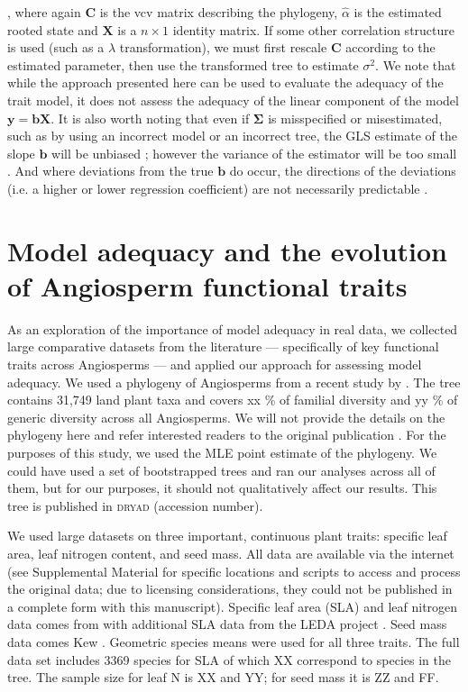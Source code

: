 \documentclass[a4paper,12pt]{article}
\begin{document}
\citep{GarlandIves2000, Freckleton2002}, where again $\mathbf{C}$ is the vcv matrix describing the phylogeny, $\hat{\alpha}$ is the estimated rooted state and $\mathbf{X}$ is a $n \times 1$ identity matrix. If some other correlation structure is used (such as a $\lambda$ transformation), we must first rescale $\mathbf{C}$ according to the estimated parameter, then use the transformed tree to estimate $\sigma^2$. We note that while the approach presented here can be used to evaluate the adequacy of the trait model, it does not assess the adequacy of the linear component of the model $\mathbf{y} = \mathbf{b}\mathbf{X}$. It is also worth noting that even if $\mathbf{\Sigma}$ is misspecified or misestimated, such as by using an incorrect model or an incorrect tree, the GLS estimate of the slope $\mathbf{b}$ will be unbiased \citep{Rao1999}; however the variance of the estimator will be too small \citep{Rohlf2006}. And where deviations from the true $\mathbf{b}$ do occur, the directions of the deviations (i.e. a higher or lower regression coefficient) are not necessarily predictable \citep{Rohlf2006}.

\section*{Model adequacy and the evolution of Angiosperm functional traits}
As an exploration of the importance of model adequacy in real data, we collected large comparative datasets from the literature --- specifically of key functional traits across Angiosperms --- and applied our approach for assessing model adequacy. We used a phylogeny of Angiosperms from a recent study by \citet{Zanne2013}. The tree contains 31,749 land plant taxa and covers xx \% of familial diversity and yy \% of generic diversity across all Angiosperms. We will not provide the details on the phylogeny here and refer interested readers to the original publication \citep{Zanne2013}. For the purposes of this study, we used the MLE point estimate of the phylogeny. We could have used a set of bootstrapped trees and ran our analyses across all of them, but for our purposes, it should not qualitatively affect our results. This tree is published in \textsc{dryad} (accession number).

We used large datasets on three important, continuous plant traits: specific leaf area, leaf nitrogen content, and seed mass.  All data are available via the internet (see Supplemental Material for specific locations and scripts to access and process the original data; due to licensing considerations, they could not be published in a complete form with this manuscript). Specific leaf area (SLA) and leaf nitrogen data comes from \citet{Wright2004} with additional SLA data from the LEDA project \citep{Kleyer2008}.   Seed mass data comes Kew \citep{Kew2008}.  Geometric species means were used for all three traits.  The full data set includes 3369 species for SLA of which XX correspond to species in the \citet{Zanne2013} tree.  The sample size for leaf N is XX and YY; for seed mass it is ZZ and FF.  
\end{document}
